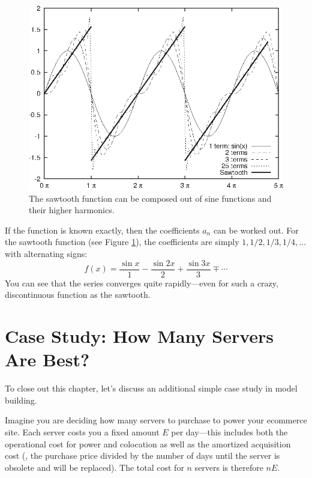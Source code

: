 \begin{figure}
\centerline{\includegraphics{img/fourier}}
  \caption{The sawtooth function can be composed out of sine functions
    and their higher harmonics.}
  \label{fig:fourier}
\end{figure}

If the function is known exactly, then the coefficients $a_n$ can be
worked out. For the sawtooth function (see Figure \ref{fig:fourier}),
the coefficients are simply $1, 1/2, 1/3, 1/4, \dots$ with alternating
signs:
%
\[
f(x) = \frac{\sin x}{1} - \frac{\sin 2x}{2} + \frac{\sin 3x}{3} \mp \dotsb
\]
%
You can see that the series converges quite rapidly---even for such a
crazy, discontinuous function as the sawtooth.


\section{Case Study: How Many Servers Are Best?}

 
To close out this chapter, let's discuss an additional simple case
study in model building.

Imagine you are deciding how many servers to purchase to power your
ecommerce site. Each server costs you a fixed amount $E$ per
day---this includes both the operational cost for power and colocation
as well as the amortized acquisition cost (\ie, the purchase price
divided by the number of days until the server is obsolete and will be
replaced). The total cost for $n$ servers is therefore $n E$.

